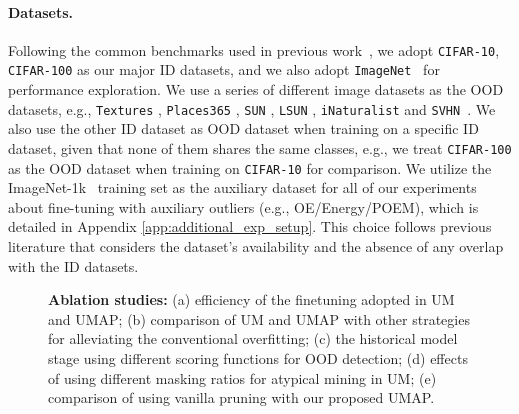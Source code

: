 \documentclass{article}
\theoremstyle{plain}
\theoremstyle{definition}
\theoremstyle{remark}
\begin{document}
\paragraph{Datasets.} Following the common benchmarks used in previous work~\citep{liu2020energy,ming2022poem}, we adopt \verb+CIFAR-10+, \verb+CIFAR-100+ \citep{krizhevsky2009learning_cifar10} as our major ID datasets, and we also adopt \texttt{ImageNet}~\citep{deng2009imagenet} for performance exploration. We use a series of different image datasets as the OOD datasets, e.g., \verb+Textures+ \citep{cimpoi2014describing}, \verb+Places365+ \citep{zhou2017places}, \verb+SUN+ \citep{5539970}, \verb+LSUN+ \citep{yu2015lsun}, \verb+iNaturalist+ \citep{van2018inaturalist} and \texttt{SVHN}~\citep{netzer2011reading_SVHN}. We also use the other ID dataset as OOD dataset when training on a specific ID dataset, given that none of them shares the same classes, e.g., we treat \verb+CIFAR-100+ as the OOD dataset when training on \verb+CIFAR-10+ for comparison. We utilize the ImageNet-1k~\citep{deng2009imagenet} training set as the auxiliary dataset for all of our experiments about fine-tuning with auxiliary outliers (e.g., OE/Energy/POEM), which is detailed in Appendix \ref{app:additional_exp_setup}. This choice follows previous literature \citep{hendrycks2018deep,liu2020energy,ming2022poem} that considers the dataset's availability and the absence of any overlap with the ID datasets.



\begin{figure*}[t!]
    \begin{center}
    
    \end{center}
    \vspace{-4mm}
    \caption{\textbf{Ablation studies:} (a) efficiency of the finetuning adopted in UM and UMAP; (b) comparison of UM and UMAP with other strategies for alleviating the conventional overfitting; (c) the historical model stage using different scoring functions for OOD detection; (d) effects of using different masking ratios for atypical mining in UM; (e) comparison of using vanilla pruning with our proposed UMAP.
}
\end{figure*}
\end{document}
